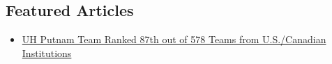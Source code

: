 \documentclass[margin,line]{res}
\begin{document}
\begin{resume}
\section{\sc Featured Articles}
\begin{itemize}
    \item[] \href{http://www.uh.edu/nsm/math/news-events/stories/2013_2014/0916_putnamGroup.php}{UH Putnam Team Ranked 87th out of 578 Teams from U.S./Canadian Institutions}\\
\end{itemize}

\end{resume}
\end{document}

